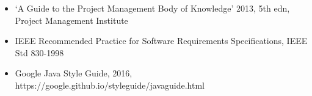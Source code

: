\begin{itemize}
	\item ‘A Guide to the Project Management Body of Knowledge’ 2013, 5th edn, Project Management Institute
	\item IEEE Recommended Practice for Software Requirements Specifications, IEEE Std 830-1998
	\item Google Java Style Guide, 2016, https://google.github.io/styleguide/javaguide.html
\end{itemize}